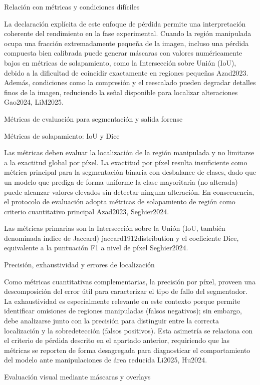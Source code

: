 {{{Relación con métricas y condiciones difíciles

La declaración explícita de este enfoque de pérdida permite una interpretación coherente del rendimiento en la fase experimental. Cuando la región manipulada ocupa una fracción extremadamente pequeña de la imagen, incluso una pérdida compuesta bien calibrada puede generar máscaras con valores numéricamente bajos en métricas de solapamiento, como la Intersección sobre Unión (IoU), debido a la dificultad de coincidir exactamente en regiones pequeñas Azad2023. Además, condiciones como la compresión y el reescalado pueden degradar detalles finos de la imagen, reduciendo la señal disponible para localizar alteraciones Gao2024, LiM2025.

Métricas de evaluación para segmentación y salida forense

Métricas de solapamiento: IoU y Dice

Las métricas deben evaluar la localización de la región manipulada y no limitarse a la exactitud global por píxel. La exactitud por píxel resulta insuficiente como métrica principal para la segmentación binaria con desbalance de clases, dado que un modelo que prediga de forma uniforme la clase mayoritaria (no alterada) puede alcanzar valores elevados sin detectar ninguna alteración. En consecuencia, el protocolo de evaluación adopta métricas de solapamiento de región como criterio cuantitativo principal Azad2023, Seghier2024.

Las métricas primarias son la Intersección sobre la Unión (IoU, también denominada índice de Jaccard) jaccard1912distribution y el coeficiente Dice, equivalente a la puntuación F1 a nivel de píxel Seghier2024.


Precisión, exhaustividad y errores de localización

Como métricas cuantitativas complementarias, la precisión por píxel, proveen una descomposición del error útil para caracterizar el tipo de fallo del segmentador. La exhaustividad es especialmente relevante en este contexto porque permite identificar omisiones de regiones manipuladas (falsos negativos); sin embargo, debe analizarse junto con la precisión para distinguir entre la correcta localización y la sobredetección (falsos positivos). Esta asimetría se relaciona con el criterio de pérdida descrito en el apartado anterior, requiriendo que las métricas se reporten de forma desagregada para diagnosticar el comportamiento del modelo ante manipulaciones de área reducida Li2025, Hu2024.

Evaluación visual mediante máscaras y overlays

}}}
